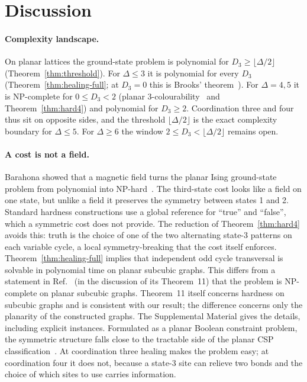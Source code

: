\documentclass[aps,pre,twocolumn,superscriptaddress,showpacs]{revtex4-2}
\theoremstyle{definition}
\theoremstyle{remark}
\begin{document}
\section{Discussion}
\label{sec:discussion}
\paragraph*{Complexity landscape.} On planar lattices the ground-state problem is polynomial for
$D_3\ge\lfloor\Delta/2\rfloor$ (Theorem~\ref{thm:threshold}). For $\Delta\le3$ it is polynomial for
every $D_3$ (Theorem~\ref{thm:healing-full}; at $D_3=0$ this is Brooks' theorem~\cite{Brooks1941}).
For $\Delta=4,5$ it is NP-complete for $0\le D_3<2$ (planar 3-colourability~\cite{GareyJohnsonStockmeyer1976}
and Theorem~\ref{thm:hard4}) and polynomial for $D_3\ge2$. Coordination three and four thus sit on
opposite sides, and the threshold $\lfloor\Delta/2\rfloor$ is the exact complexity boundary for
$\Delta\le5$. For $\Delta\ge6$ the window $2\le D_3<\lfloor\Delta/2\rfloor$ remains open.

\paragraph*{A cost is not a field.} Barahona showed that a magnetic field turns the planar Ising
ground-state problem from polynomial into NP-hard~\cite{Barahona1982}. The third-state cost looks
like a field on one state, but unlike a field it preserves the symmetry between states 1 and 2.
Standard hardness constructions use a global reference for ``true'' and ``false'', which a
symmetric cost does not provide. The reduction of Theorem~\ref{thm:hard4} avoids this: truth is
the choice of one of the two alternating state-3 patterns on each variable cycle, a local
symmetry-breaking that the cost itself enforces. Theorem~\ref{thm:healing-full} implies that independent odd cycle transversal is
solvable in polynomial time on planar subcubic graphs. This differs from a statement in
Ref.~\cite{Johnson2025} (in the discussion of its Theorem~11) that the problem is NP-complete on
planar subcubic graphs. Theorem~11 itself concerns hardness on subcubic graphs and is consistent
with our result; the difference concerns only the planarity of the constructed graphs. The Supplemental Material gives the details, including
explicit instances. Formulated as a planar Boolean constraint problem, the
symmetric structure falls close to the tractable side of the planar CSP
classification~\cite{KazdaKolmogorovRolinek2018,FullaZivny2017}. At coordination three healing makes the problem easy;
at coordination four it does not, because a state-3 site can relieve two bonds and the choice of
which sites to use carries information.
\end{document}
